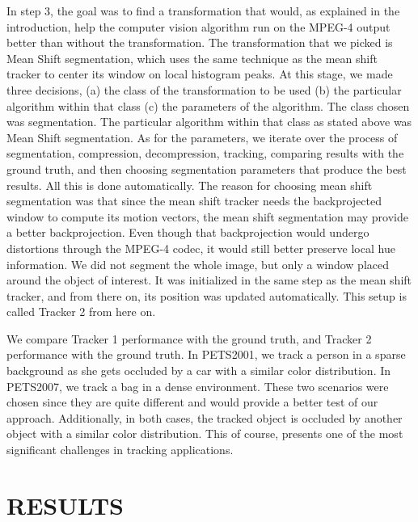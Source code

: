 \documentclass{article}
\begin{document}
In step 3, the goal was to find a transformation that would, as explained in the introduction, help the computer vision algorithm run on the MPEG-4 output better than without the transformation.  The transformation that we picked is Mean Shift segmentation, which uses the same technique as the mean shift tracker to center its window on local histogram peaks.  At this stage, we made three decisions, (a) the class of the transformation to be used (b) the particular algorithm within that class (c) the parameters of the algorithm.  The class chosen was segmentation.  The particular algorithm within that class as stated above was Mean Shift segmentation.  As for the parameters, we iterate over the process of segmentation, compression, decompression, tracking, comparing results with the ground truth, and then choosing segmentation parameters that produce the best results.  All this is done automatically.  The reason for choosing mean shift segmentation was that since the mean shift tracker needs the backprojected window to compute its motion vectors, the mean shift segmentation may provide a better backprojection.  Even though that backprojection would undergo distortions through the MPEG-4 codec, it would still better preserve local hue information.  We did not segment the whole image, but only a window placed around the object of interest.  It was initialized in the same step as the mean shift tracker, and from there on, its position was updated automatically.  This setup is called Tracker 2 from here on.  

We compare Tracker 1 performance with the ground truth, and Tracker 2 performance with the ground truth.  In PETS2001, we track a person in a sparse background as she gets occluded by a car with a similar color distribution.  In PETS2007, we track a bag in a dense environment.  These two scenarios were chosen since they are quite different and would provide a better test of our approach.  Additionally, in both cases, the tracked object is occluded by another object with a similar color distribution.  This of course, presents one of the most significant challenges in tracking applications. 

\section{RESULTS}
\end{document}
